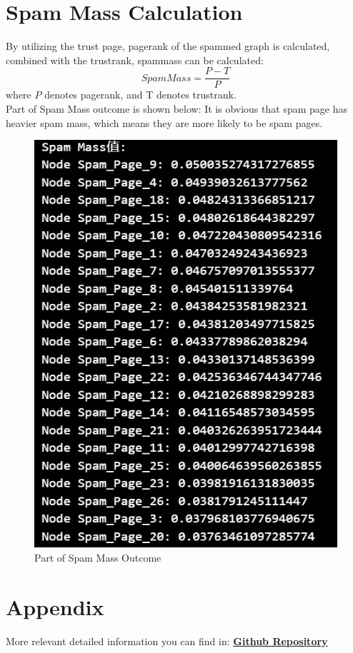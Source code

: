 \documentclass{article}
\begin{document}
	\section*{Spam Mass Calculation}
	By utilizing the trust page, pagerank of the spammed graph is calculated, combined with the trustrank, spammass can be calculated:
	$$Spam Mass = \frac{P-T}{P}$$
	where $P$ denotes pagerank, and T denotes trustrank.\\
	Part of Spam Mass outcome is shown below: It is obvious that spam page has heavier spam mass, which means they are more likely to be spam pages.
	\begin{figure}[H]
		\centering
		\includegraphics[scale=0.5]{spammass.png}
		\caption{Part of Spam Mass Outcome}
	\end{figure}
	
	\section*{Appendix}
	More relevant detailed information you can find in: 
	\href{https://github.com/DingYX0731/Selected-Topics-in-Frontiers-of-Statistics}{\textbf{Github Repository}}
	
	
\end{document}
